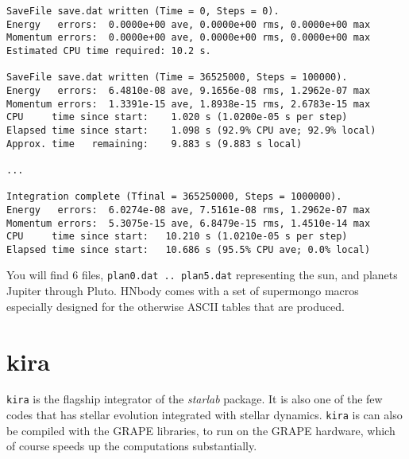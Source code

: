 \begin{verbatim}
SaveFile save.dat written (Time = 0, Steps = 0).
Energy   errors:  0.0000e+00 ave, 0.0000e+00 rms, 0.0000e+00 max
Momentum errors:  0.0000e+00 ave, 0.0000e+00 rms, 0.0000e+00 max
Estimated CPU time required: 10.2 s.
 
SaveFile save.dat written (Time = 36525000, Steps = 100000).
Energy   errors:  6.4810e-08 ave, 9.1656e-08 rms, 1.2962e-07 max
Momentum errors:  1.3391e-15 ave, 1.8938e-15 rms, 2.6783e-15 max
CPU     time since start:    1.020 s (1.0200e-05 s per step)
Elapsed time since start:    1.098 s (92.9% CPU ave; 92.9% local)
Approx. time   remaining:    9.883 s (9.883 s local)
 
...
 
Integration complete (Tfinal = 365250000, Steps = 1000000).
Energy   errors:  6.0274e-08 ave, 7.5161e-08 rms, 1.2962e-07 max
Momentum errors:  5.3075e-15 ave, 6.8479e-15 rms, 1.4510e-14 max
CPU     time since start:   10.210 s (1.0210e-05 s per step)
Elapsed time since start:   10.686 s (95.5% CPU ave; 0.0% local)

\end{verbatim}\normalsize

You will find 6 files, {\tt plan0.dat .. plan5.dat} representing
the sun, and planets Jupiter through Pluto. HNbody comes with a
set of supermongo macros especially  designed for the
otherwise ASCII tables that are produced.

\section{kira}

{\tt kira} is the flagship integrator of the {\it starlab} package. It is also
one of the few codes that has stellar evolution integrated with stellar
dynamics. {\tt kira} is can also be compiled with the GRAPE libraries,
to run on the GRAPE hardware, which of course speeds up the computations 
substantially.

